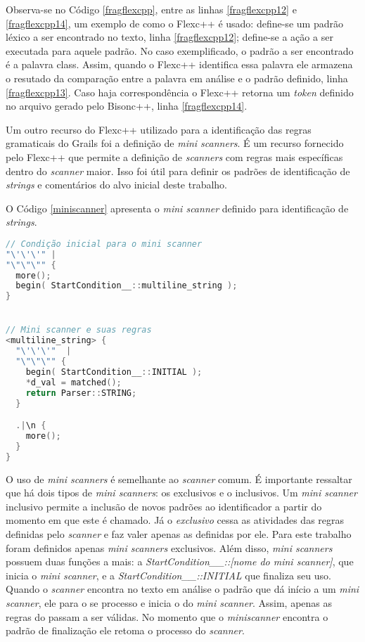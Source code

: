 Observa-se no Código \ref{fragflexcpp}, entre as linhas \ref{fragflexcpp12} e \ref{fragflexcpp14}, um exemplo de como o \textsf{Flexc++} é usado:
define-se um padrão léxico a ser encontrado no texto, linha \ref{fragflexcpp12};
define-se a ação a ser executada para aquele padrão. No caso exemplificado, o
padrão a ser encontrado é a palavra \textsf{class}. Assim, quando o Flexc++
identifica essa palavra ele armazena o resutado da comparação entre a palavra em
análise e o padrão definido, linha \ref{fragflexcpp13}. Caso haja correspondência o
Flexc++ retorna um \textit{token} definido no arquivo gerado pelo
\textsf{Bisonc++}, linha \ref{fragflexcpp14}.

Um outro recurso do \textsf{Flexc++} utilizado para a identificação das regras
gramaticais do \textsf{Grails} foi a definição de \textit{mini scanners}. É um
recurso fornecido pelo \textsf{Flexc++} que permite a definição de \textit{scanners}
com regras mais específicas dentro do \textit{scanner} maior. Isso foi útil para
definir os padrões de identificação de \textit{strings} e comentários do alvo inicial deste trabalho.

O Código \ref{miniscanner} apresenta o \textit{mini scanner} definido para
identificação de \textit{strings}.

\begin{lstlisting}[language=C++, label=miniscanner, caption=Implementação do Mini scanner de Strings]
// Condição inicial para o mini scanner
"\'\'\'" |
"\"\"\"" {
  more();
  begin( StartCondition__::multiline_string );
}


// Mini scanner e suas regras
<multiline_string> {
  "\'\'\'"  |
  "\"\"\"" {
    begin( StartCondition__::INITIAL );
    *d_val = matched();
    return Parser::STRING;
  }

  .|\n {
    more();
  }
}
\end{lstlisting}

O uso de \textit{mini scanners} é semelhante ao \textit{scanner} comum. É
importante ressaltar que há dois tipos de \textit{mini scanners}: os exclusivos
e o inclusivos. Um \textit{mini scanner} inclusivo permite a inclusão de novos
padrões ao identificador a partir do momento em que este é chamado. Já o
\textit{exclusivo} cessa as atividades das regras definidas pelo \textit{scanner}
e faz valer apenas as definidas por ele. Para este trabalho foram definidos apenas
\textit{mini scanners} exclusivos. Além disso, \textit{mini scanners} possuem
duas funções a mais: a \textit{StartCondition\_\_::[nome do mini scanner]}, que
inicia o \textit{mini scanner}, e a \textit{StartCondition\_\_::INITIAL} que
finaliza seu uso. Quando o \textit{scanner} encontra no texto em análise o
padrão que dá início a um \textit{mini scanner}, ele para o se processo e
inicia o do \textit{mini scanner}. Assim, apenas as regras do \miniscanner passam a ser
válidas. No momento que o \textit{miniscanner} encontra o padrão de finalização
ele retoma o processo do \textit{scanner}.

